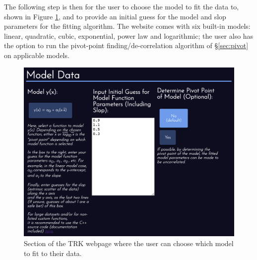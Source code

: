 The following step is then for the user to choose the model to fit the data to, shown in Figure \ref{fig:websitechoosemodel}, and to provide an initial guess for the model and slop parameters for the fitting algorithm. The website comes with six built-in models: linear, quadratic, cubic, exponential, power law and logarithmic; the user also has the option to run the pivot-point finding/de-correlation algorithm of \S\ref{sec:pivot} on applicable models.
\begin{figure}
    \centering
    \includegraphics[width=1.0\linewidth]{figures/websitechoosemodel.png}
    \caption{Section of the TRK webpage where the user can choose which model to fit to their data.}
    \label{fig:websitechoosemodel}
\end{figure}

